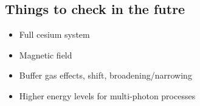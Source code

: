 \documentclass{article}
\begin{document}
\begin{spacing}{1.1}
\subsection{Things to check in the futre}
\begin{itemize}
\item Full cesium system
\item Magnetic field
\item Buffer gas effects, shift, broadening/narrowing
\item Higher energy levels for multi-photon processes
\end{itemize}

\newpage
{}



\end{spacing}
\end{document}
